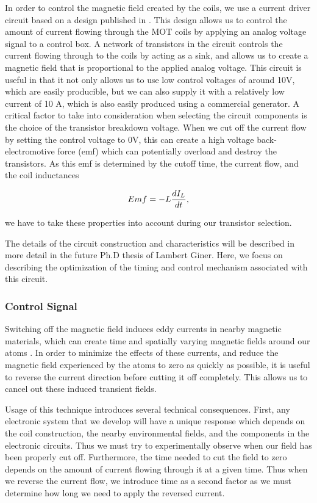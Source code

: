 In order to control the magnetic field created by the coils, we use a current
driver circuit based on a design published in \cite{garrido2007}.  This design
allows us to control the amount of current flowing through the MOT coils by
applying an analog voltage signal to a control box.  A network of transistors
in the circuit controls the current flowing through to the coils by acting as
a sink, and allows us to create a magnetic field that is proportional to the
applied analog voltage. This circuit is useful in that it not only allows us
to use low control voltages of around 10V, which are easily producible, but we
can also supply it with a relatively low current of 10 A, which is also easily
produced using a commercial generator.  A critical factor to take into
consideration when selecting the circuit components is the choice of the
transistor breakdown voltage.  When we cut off the current flow by setting the
control voltage to 0V, this can create a high voltage back-electromotive force (emf) which can potentially overload and destroy the transistors.  As this emf is determined by the cutoff time, the current flow, and the coil inductances

\begin{equation}
  \label{eq:emf}
  Emf = -L\frac{d I_L}{d t},
\end{equation}
 
\noindent
we have to take these properties into account during our transistor selection.

The details of the circuit construction and characteristics will be described in more detail in the future Ph.D thesis of Lambert Giner.  Here, we focus on describing the optimization of the timing and control mechanism associated with this circuit.


\subsubsection{Control Signal} 

Switching off the magnetic field induces eddy currents in nearby magnetic materials, which can create time and spatially varying magnetic fields around our atoms \cite{garrido2007}.  In order to minimize the effects of these currents, and reduce the magnetic field experienced by the atoms to zero as quickly as possible, it is useful to reverse the current direction before cutting it off completely.  This allows us to cancel out these induced transient fields.

Usage of this technique introduces several technical consequences.  First, any
electronic system that we develop will have a unique response which depends on
the coil construction, the nearby environmental fields, and the components in
the electronic circuits.  Thus we must try to experimentally observe when our
field has been properly cut off.  Furthermore, the time needed to cut the
field to zero depends on the amount of current flowing through it at a given
time.  Thus when we reverse the current flow, we introduce time as a second
factor as we must determine how long we need to apply the reversed current.  

